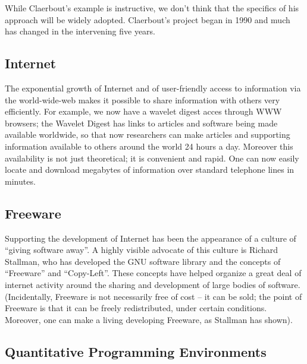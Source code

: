 While Claerbout's example is instructive, we don't think that
the specifics of his approach will be widely adopted.
Claerbout's project began in 1990 and much has changed in
the intervening five years.  

\subsection{Internet}

The exponential growth of Internet and 
of user-friendly access to information via the world-wide-web
makes it possible to share information with others very efficiently.
For example, we now have a wavelet digest acces through WWW browsers;
the Wavelet Digest has links to articles and software being made
available worldwide, so that now researchers can make  articles
and supporting information available to others around the world
24 hours a day. Moreover this availability is not just theoretical;
it is convenient and rapid.  One can now easily locate and
download megabytes of information
over standard telephone lines in minutes. 

\subsection{Freeware} 

Supporting the development of Internet has been
the appearance of a culture of ``giving software away''.
A highly visible advocate of this culture is Richard Stallman,
who has developed the GNU software library and the 
concepts of ``Freeware'' and ``Copy-Left''.  These
concepts have helped organize a great deal of internet activity
around the sharing and development of large bodies of
software. (Incidentally, Freeware is not necessarily free
of cost -- it can be sold; the point of Freeware is that it
can be freely redistributed, under certain conditions.
Moreover, one can make a living developing Freeware,
as Stallman has shown).     

\subsection{Quantitative Programming Environments}


